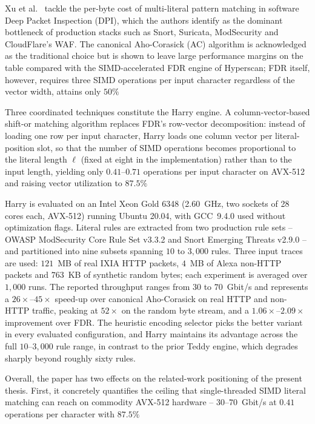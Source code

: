 
Xu et al.\ \cite{Xu2023Harry} tackle the per-byte cost of multi-literal pattern matching in software Deep Packet Inspection (DPI), which the authors identify as the dominant bottleneck of production stacks such as Snort, Suricata, ModSecurity and CloudFlare's WAF. The canonical Aho-Corasick (AC) algorithm is acknowledged as the traditional choice but is shown to leave large performance margins on the table compared with the SIMD-accelerated FDR engine of Hyperscan; FDR itself, however, requires three SIMD operations per input character regardless of the vector width, attains only $50\%$

Three coordinated techniques constitute the Harry engine. A column-vector-based shift-or matching algorithm replaces FDR's row-vector decomposition: instead of loading one row per input character, Harry loads one column vector per literal-position slot, so that the number of SIMD operations becomes proportional to the literal length $\ell$ (fixed at eight in the implementation) rather than to the input length, yielding only $0.41$--$0.71$ operations per input character on AVX-512 and raising vector utilization to $87.5\%$

Harry is evaluated on an Intel Xeon Gold 6348 (2.60~GHz, two sockets of 28 cores each, AVX-512) running Ubuntu 20.04, with GCC~9.4.0 used without optimization flags. Literal rules are extracted from two production rule sets -- OWASP ModSecurity Core Rule Set v3.3.2 and Snort Emerging Threats v2.9.0 -- and partitioned into nine subsets spanning $10$ to $3{,}000$ rules. Three input traces are used: $121$~MB of real IXIA HTTP packets, $4$~MB of Alexa non-HTTP packets and $763$~KB of synthetic random bytes; each experiment is averaged over $1{,}000$ runs. The reported throughput ranges from $30$ to $70$~Gbit/s and represents a $26\times$--$45\times$ speed-up over canonical Aho-Corasick on real HTTP and non-HTTP traffic, peaking at $52\times$ on the random byte stream, and a $1.06\times$--$2.09\times$ improvement over FDR. The heuristic encoding selector picks the better variant in every evaluated configuration, and Harry maintains its advantage across the full $10$--$3{,}000$ rule range, in contrast to the prior Teddy engine, which degrades sharply beyond roughly sixty rules.

Overall, the paper has two effects on the related-work positioning of the present thesis. First, it concretely quantifies the ceiling that single-threaded SIMD literal matching can reach on commodity AVX-512 hardware -- $30$--$70$~Gbit/s at $0.41$ operations per character with $87.5\%$


